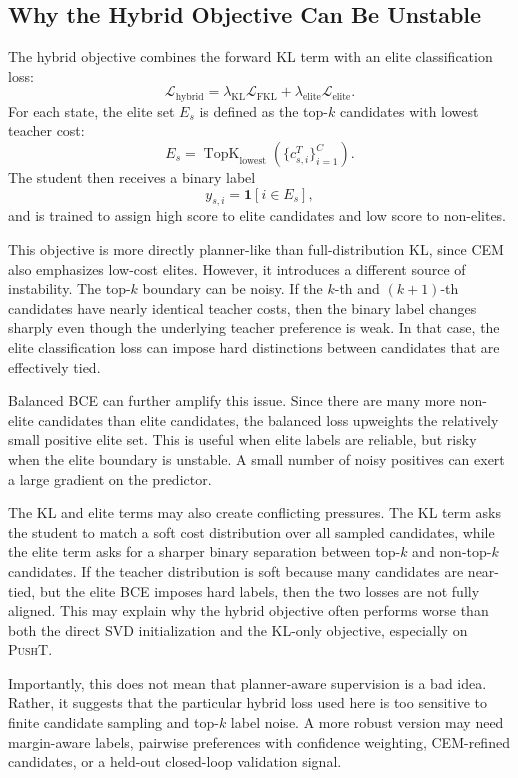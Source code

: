 \documentclass[11pt]{article}
\begin{document}
\subsection{Why the Hybrid Objective Can Be Unstable}
\label{sec:hybrid_instability_analysis}

The hybrid objective combines the forward KL term with an elite classification loss:
\[
    \mathcal{L}_{\mathrm{hybrid}}
    =
    \lambda_{\mathrm{KL}}
    \mathcal{L}_{\mathrm{FKL}}
    +
    \lambda_{\mathrm{elite}}
    \mathcal{L}_{\mathrm{elite}}.
\]
For each state, the elite set \(E_s\) is defined as the top-\(k\) candidates with lowest teacher cost:
\[
    E_s
    =
    \operatorname{TopK}_{\mathrm{lowest}}
    \left(
        \{c^{T}_{s,i}\}_{i=1}^{C}
    \right).
\]
The student then receives a binary label
\[
    y_{s,i}
    =
    \mathbf{1}[i \in E_s],
\]
and is trained to assign high score to elite candidates and low score to non-elites.

This objective is more directly planner-like than full-distribution KL, since CEM also emphasizes low-cost elites. However, it introduces a different source of instability. The top-\(k\) boundary can be noisy. If the \(k\)-th and \((k+1)\)-th candidates have nearly identical teacher costs, then the binary label changes sharply even though the underlying teacher preference is weak. In that case, the elite classification loss can impose hard distinctions between candidates that are effectively tied.

Balanced BCE can further amplify this issue. Since there are many more non-elite candidates than elite candidates, the balanced loss upweights the relatively small positive elite set. This is useful when elite labels are reliable, but risky when the elite boundary is unstable. A small number of noisy positives can exert a large gradient on the predictor.

The KL and elite terms may also create conflicting pressures. The KL term asks the student to match a soft cost distribution over all sampled candidates, while the elite term asks for a sharper binary separation between top-\(k\) and non-top-\(k\) candidates. If the teacher distribution is soft because many candidates are near-tied, but the elite BCE imposes hard labels, then the two losses are not fully aligned. This may explain why the hybrid objective often performs worse than both the direct SVD initialization and the KL-only objective, especially on \textsc{PushT}.

Importantly, this does not mean that planner-aware supervision is a bad idea. Rather, it suggests that the particular hybrid loss used here is too sensitive to finite candidate sampling and top-\(k\) label noise. A more robust version may need margin-aware labels, pairwise preferences with confidence weighting, CEM-refined candidates, or a held-out closed-loop validation signal.
\end{document}
